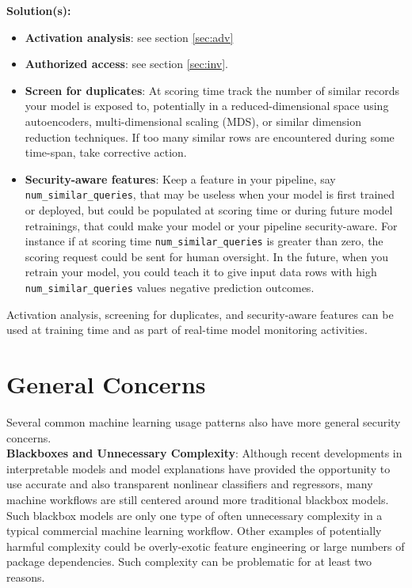 \documentclass[fleqn]{article}
\begin{document}
\noindent\textbf{Solution(s):} 
\begin{itemize}

\item \textbf{Activation analysis}: see section \ref{sec:adv}

\item \textbf{Authorized access}: see section \ref{sec:inv}.

\item \textbf{Screen for duplicates}: At scoring time track the number of similar records your model is exposed to, potentially in a reduced-dimensional space using autoencoders, multi-dimensional scaling (MDS), or similar dimension reduction techniques. If too many similar rows are encountered during some time-span, take corrective action.

\item \noindent\textbf{Security-aware features}: Keep a feature in your pipeline, say \texttt{num\_similar\_queries}, that may be useless when your model is first trained or deployed, but could be populated at scoring time or during future model retrainings, that could make your model or your pipeline security-aware. For instance if at scoring time \texttt{num\_similar\_queries} is greater than zero, the scoring request could be sent for human oversight. In the future, when you retrain your model, you could teach it to give input data rows with high \texttt{num\_similar\_queries} values negative prediction outcomes.

\end{itemize}

\noindent Activation analysis, screening for duplicates, and security-aware features can be used at training time and as part of real-time model monitoring activities.

\section{General Concerns}

Several common machine learning usage patterns also have more general security concerns.\\

\noindent\textbf{Blackboxes and Unnecessary Complexity}: Although recent developments in interpretable models and model explanations have provided the opportunity to use accurate and also transparent nonlinear classifiers and regressors, many machine workflows are still centered around more traditional blackbox models. Such blackbox models are only one type of often unnecessary complexity in a typical commercial machine learning workflow. Other examples of potentially harmful complexity could be overly-exotic feature engineering or large numbers of package dependencies. Such complexity can be problematic for at least two reasons. 
\end{document}
